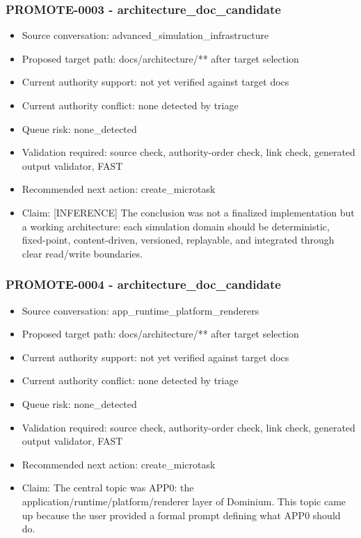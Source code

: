 \documentclass[11pt,a4paper]{report}
\begin{document}
\subsubsection{PROMOTE-0003 - architecture\_doc\_candidate}

\begin{itemize}
\item Source conversation: advanced\_simulation\_infrastructure
\item Proposed target path: docs/architecture/** after target selection
\item Current authority support: not yet verified against target docs
\item Current authority conflict: none detected by triage
\item Queue risk: none\_detected
\item Validation required: source check, authority-order check, link check, generated output validator, FAST
\item Recommended next action: create\_microtask
\item Claim: [INFERENCE] The conclusion was not a finalized implementation but a working architecture: each simulation domain should be deterministic, fixed-point, content-driven, versioned, replayable, and integrated through clear read/write boundaries.
\end{itemize}

\subsubsection{PROMOTE-0004 - architecture\_doc\_candidate}

\begin{itemize}
\item Source conversation: app\_runtime\_platform\_renderers
\item Proposed target path: docs/architecture/** after target selection
\item Current authority support: not yet verified against target docs
\item Current authority conflict: none detected by triage
\item Queue risk: none\_detected
\item Validation required: source check, authority-order check, link check, generated output validator, FAST
\item Recommended next action: create\_microtask
\item Claim: The central topic was APP0: the application/runtime/platform/renderer layer of Dominium. This topic came up because the user provided a formal prompt defining what APP0 should do.
\end{itemize}
\end{document}
